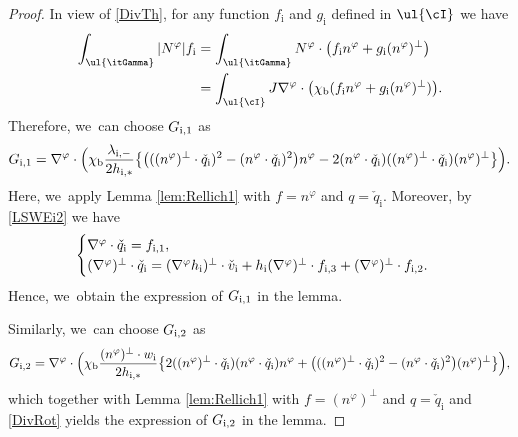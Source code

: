 \begin{proof}
In view of \eqref{DivTh}, for any function $f_\mathrm{i}$ and $g_\mathrm{i}$ defined in $\ul{\cI}$ we have
\begin{align*}
\int_{\ul{\itGamma}}|N^\varphi|f_\mathrm{i}
&= \int_{\ul{\itGamma}}N^\varphi\cdot\bigl(f_\mathrm{i}n^\varphi + g_\mathrm{i}(n^\varphi)^\perp\bigr) \\
&= \int_{\ul{\cI}}J\nabla^\varphi\cdot\bigl(\chi_\mathrm{b}(f_\mathrm{i}n^\varphi + g_\mathrm{i}(n^\varphi)^\perp) \bigr).
\end{align*}
Therefore, we~can choose $G_{{\rm i},1}$ as
\[
G_{{\rm i},1} = \nabla^\varphi\cdot\Bigl(\chi_\mathrm{b}\frac{\lambda_{{\rm i},-}}{2h_{{\rm i},*}}\bigl\{
\bigl(((n^\varphi)^\perp\cdot\check{q}_\mathrm{i})^2 - (n^\varphi\cdot\check{q}_\mathrm{i})^2 \bigr)n^\varphi
- 2(n^\varphi\cdot\check{q}_\mathrm{i})((n^\varphi)^\perp\cdot\check{q}_\mathrm{i}) (n^\varphi)^\perp \bigr\} \Bigr).
\]
Here, we~apply Lemma \ref{lem:Rellich1} with $f=n^\varphi$ and $q=\check{q}_\mathrm{i}$.
Moreover, by \eqref{LSWEi2} we have
\begin{equation}\label{DivRot}
\begin{cases}
\nabla^\varphi\cdot\check{q}_\mathrm{i}=f_{{\rm i},1}, \\
(\nabla^\varphi)^\perp\cdot\check{q}_\mathrm{i}
=(\nabla^\varphi h_\mathrm{i})^\perp\cdot\check{v}_\mathrm{i} + h_\mathrm{i}(\nabla^\varphi)^\perp\cdot f_{{\rm i},3} + (\nabla^\varphi)^\perp\cdot f_{{\rm i},2}.
\end{cases}
\end{equation}
Hence, we~obtain the expression of $G_{{\rm i},1}$ in the lemma.

Similarly, we~can choose $G_{{\rm i},2}$ as
\[
G_{{\rm i},2 } = \nabla^\varphi\cdot\Bigl(\chi_\mathrm{b}\frac{(n^\varphi)^\perp\cdot w_\mathrm{i}}{2h_{{\rm i},*}}\bigl\{
2((n^\varphi)^\perp\cdot\check{q}_\mathrm{i})(n^\varphi\cdot\check{q}_\mathrm{i}) n^\varphi
+ \bigl(((n^\varphi)^\perp\cdot\check{q}_\mathrm{i})^2 - (n^\varphi\cdot\check{q}_\mathrm{i})^2 \bigr) (n^\varphi)^\perp \bigr\} \Bigr),
\]
which together with Lemma \ref{lem:Rellich1} with $f=(n^\varphi)^\perp$ and $q=\check{q}_\mathrm{i}$
and \eqref{DivRot} yields the expression of $G_{{\rm i},2}$ in the lemma.


\end{proof}
